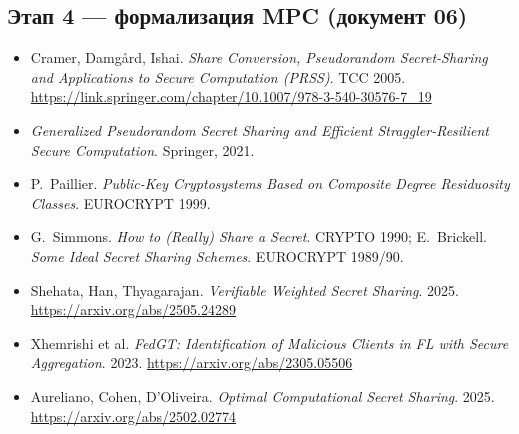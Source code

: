 \documentclass[11pt]{article}
\begin{document}
\subsection*{Этап 4 --- формализация MPC (документ 06)}

\begin{itemize}[leftmargin=1.3cm]
  \item Cramer, Damgård, Ishai. \emph{Share Conversion, Pseudorandom
        Secret-Sharing and Applications to Secure Computation (PRSS)}. TCC 2005.
        \url{https://link.springer.com/chapter/10.1007/978-3-540-30576-7_19}
  \item \emph{Generalized Pseudorandom Secret Sharing and Efficient
        Straggler-Resilient Secure Computation}. Springer, 2021.
  \item P.~Paillier. \emph{Public-Key Cryptosystems Based on Composite Degree
        Residuosity Classes}. EUROCRYPT 1999.
  \item G.~Simmons. \emph{How to (Really) Share a Secret}. CRYPTO 1990;
        E.~Brickell. \emph{Some Ideal Secret Sharing Schemes}. EUROCRYPT
        1989/90.
  \item Shehata, Han, Thyagarajan. \emph{Verifiable Weighted Secret Sharing}.
        2025. \url{https://arxiv.org/abs/2505.24289}
  \item Xhemrishi et al. \emph{FedGT: Identification of Malicious Clients in FL
        with Secure Aggregation}. 2023. \url{https://arxiv.org/abs/2305.05506}
  \item Aureliano, Cohen, D'Oliveira. \emph{Optimal Computational Secret
        Sharing}. 2025. \url{https://arxiv.org/abs/2502.02774}
\end{itemize}
\end{document}
